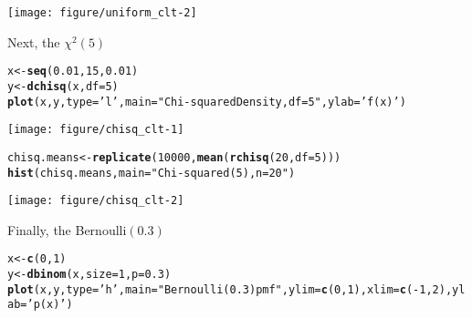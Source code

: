 \documentclass[addpoints,12pt]{exam}\usepackage[]{graphicx}\usepackage[]{color}
\makeatletter
\def\maxwidth{ %
  \ifdim\Gin@nat@width>\linewidth
    \linewidth
  \else
    \Gin@nat@width
  \fi
}
\newcommand{\hlnum}[1]{\textcolor[rgb]{0.686,0.059,0.569}{#1}}%
\newcommand{\hlstr}[1]{\textcolor[rgb]{0.192,0.494,0.8}{#1}}%
\newcommand{\hlopt}[1]{\textcolor[rgb]{0,0,0}{#1}}%
\newcommand{\hlstd}[1]{\textcolor[rgb]{0.345,0.345,0.345}{#1}}%
\newcommand{\hlkwb}[1]{\textcolor[rgb]{0.69,0.353,0.396}{#1}}%
\newcommand{\hlkwc}[1]{\textcolor[rgb]{0.333,0.667,0.333}{#1}}%
\newcommand{\hlkwd}[1]{\textcolor[rgb]{0.737,0.353,0.396}{\textbf{#1}}}%
\newenvironment{kframe}{%
 \def\at@end@of@kframe{}%
 \ifinner\ifhmode%
  \def\at@end@of@kframe{\end{minipage}}%
  \begin{minipage}{\columnwidth}%
 \fi\fi%
 \def\FrameCommand##1{\hskip\@totalleftmargin \hskip-\fboxsep
 \colorbox{shadecolor}{##1}\hskip-\fboxsep
     \hskip-\linewidth \hskip-\@totalleftmargin \hskip\columnwidth}%
 \MakeFramed {\advance\hsize-\width
   \@totalleftmargin\z@ \linewidth\hsize
   \@setminipage}}%
 {\par\unskip\endMakeFramed%
 \at@end@of@kframe}
\newenvironment{knitrout}{}{} %
\makeatother
\begin{document}
\begin{questions}
\begin{solution}
\begin{knitrout}
{\centering \texttt{[image: figure/uniform\_clt-2]} 

}



\end{knitrout}
Next, the $\chi^2(5)$	
\begin{knitrout}
\color{fgcolor}\begin{kframe}
\begin{alltt}
\hlstd{x} \hlkwb{<-} \hlkwd{seq}\hlstd{(}\hlnum{0.01}\hlstd{,} \hlnum{15}\hlstd{,} \hlnum{0.01}\hlstd{)}
\hlstd{y} \hlkwb{<-} \hlkwd{dchisq}\hlstd{(x,} \hlkwc{df} \hlstd{=} \hlnum{5}\hlstd{)}
\hlkwd{plot}\hlstd{(x,y,} \hlkwc{type} \hlstd{=} \hlstr{'l'}\hlstd{,} \hlkwc{main} \hlstd{=} \hlstr{"Chi-squared Density, df = 5"}\hlstd{,} \hlkwc{ylab} \hlstd{=} \hlstr{'f(x)'}\hlstd{)}
\end{alltt}
\end{kframe}

{\centering \texttt{[image: figure/chisq\_clt-1]} 

}


\begin{kframe}\begin{alltt}
\hlstd{chisq.means} \hlkwb{<-} \hlkwd{replicate}\hlstd{(}\hlnum{10000}\hlstd{,} \hlkwd{mean}\hlstd{(}\hlkwd{rchisq}\hlstd{(}\hlnum{20}\hlstd{,} \hlkwc{df} \hlstd{=} \hlnum{5}\hlstd{)))}
\hlkwd{hist}\hlstd{(chisq.means,} \hlkwc{main} \hlstd{=} \hlstr{"Chi-squared(5), n = 20"}\hlstd{)}
\end{alltt}
\end{kframe}

{\centering \texttt{[image: figure/chisq\_clt-2]} 

}



\end{knitrout}
Finally, the Bernoulli$(0.3)$
\begin{knitrout}
\color{fgcolor}\begin{kframe}
\begin{alltt}
\hlstd{x} \hlkwb{<-} \hlkwd{c}\hlstd{(}\hlnum{0}\hlstd{,}\hlnum{1}\hlstd{)}
\hlstd{y} \hlkwb{<-} \hlkwd{dbinom}\hlstd{(x,} \hlkwc{size} \hlstd{=} \hlnum{1}\hlstd{,} \hlkwc{p} \hlstd{=} \hlnum{0.3}\hlstd{)}
\hlkwd{plot}\hlstd{(x, y,} \hlkwc{type} \hlstd{=} \hlstr{'h'}\hlstd{,} \hlkwc{main} \hlstd{=} \hlstr{"Bernoulli(0.3) pmf"}\hlstd{,} \hlkwc{ylim} \hlstd{=} \hlkwd{c}\hlstd{(}\hlnum{0}\hlstd{,}\hlnum{1}\hlstd{),} \hlkwc{xlim} \hlstd{=} \hlkwd{c}\hlstd{(}\hlopt{-}\hlnum{1}\hlstd{,} \hlnum{2}\hlstd{),} \hlkwc{ylab} \hlstd{=} \hlstr{'p(x)'}\hlstd{)}
\end{alltt}
\end{kframe}


\end{knitrout}
\end{solution}
\end{questions}
\end{document}
